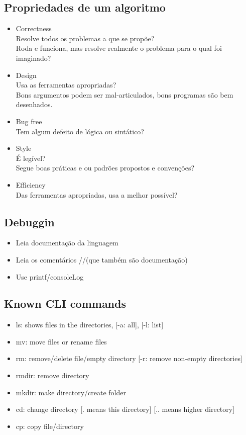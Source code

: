 \documentclass[12pt,a4paper]{article} %
\begin{document}
\subsection{Propriedades de um algoritmo}
\begin{itemize}
\item Correctness\\Resolve todos os problemas a que se propõe?\\Roda e funciona, mas resolve realmente o problema para o qual foi imaginado?
\item Design\\Usa as ferramentas apropriadas?\\Bons argumentos podem ser mal-articulados, bons programas são bem desenhados.
\item Bug free\\Tem algum defeito de lógica ou sintático? 
\item Style\\É legível?\\Segue boas práticas e ou padrões propostos e convenções?
\item Efficiency\\Das ferramentas apropriadas, usa a melhor possível?
\end{itemize}

\subsection{Debuggin}
\begin{itemize}
\item Leia documentação da linguagem
\item Leia os comentários //(que também são documentação)
\item Use printf/consoleLog
\end{itemize}

\subsection{Known CLI commands}
\begin{itemize}
\item ls: shows files in the directories, [-a: all], [-l: list]
\item mv: move files or rename files
\item rm: remove/delete file/empty directory [-r: remove non-empty directories]
\item rmdir: remove directory
\item mkdir: make directory/create folder
\item cd: change directory [. means this directory] [.. means higher directory]
\item cp: copy file/directory
\end{itemize}
\end{document}
